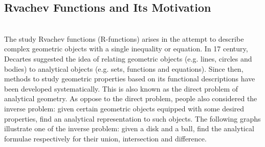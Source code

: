 \documentclass[11pt]{amsart}
\theoremstyle{definition}
\begin{document}
\subsection{Rvachev Functions and Its Motivation}~\\
The study Rvachev functions (R-functions) arises in the attempt
to describe complex geometric objects with a single inequality or equation. In
17 century, Decartes suggested the idea of relating geometric objects (e.g.
lines, circles and bodies) to analytical objects (e.g. sets, functions and
equations). Since then, methods to study geometric properties based on its
functional descriptions have been developed systematically. This is also known
as the direct problem of analytical geometry. As oppose to the direct problem,
people also considered the inverse problem: given certain geometric objects
equipped with some desired properties, find an analytical representation to
such objects. The following graphs illustrate one of the inverse problem: given a disk and a ball, find the analytical formulae respectively for their union, intersection and difference. 
\end{document}
